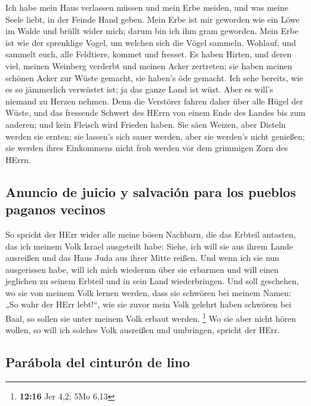  Ich habe mein Haus verlassen müssen und mein Erbe meiden,
und was meine Seele liebt, in der Feinde Hand geben.  Mein
Erbe ist mir geworden wie ein Löwe im Walde und brüllt wider mich; darum
bin ich ihm gram geworden.  Mein Erbe ist wie der
sprenklige Vogel, um welchen sich die Vögel sammeln. Wohlauf, und
sammelt euch, alle Feldtiere, kommet und fresset.  Es
haben Hirten, und deren viel, meinen Weinberg verderbt und meinen Acker
zertreten; sie haben meinen schönen Acker zur Wüste gemacht, sie haben's
öde gemacht.  Ich sehe bereits, wie es so jämmerlich
verwüstet ist; ja das ganze Land ist wüst. Aber es will's niemand zu
Herzen nehmen.  Denn die Verstörer fahren daher über alle
Hügel der Wüste, und das fressende Schwert des HErrn von einem Ende des
Landes bis zum anderen; und kein Fleisch wird Frieden haben.
 Sie säen Weizen, aber Disteln werden sie ernten; sie
lassen's sich sauer werden, aber sie werden's nicht genießen; sie werden
ihres Einkommens nicht froh werden vor dem grimmigen Zorn des HErrn.

\hypertarget{anuncio-de-juicio-y-salvaciuxf3n-para-los-pueblos-paganos-vecinos}{%
\subsection{Anuncio de juicio y salvación para los pueblos paganos
vecinos}\label{anuncio-de-juicio-y-salvaciuxf3n-para-los-pueblos-paganos-vecinos}}

 So spricht der HErr wider alle meine bösen Nachbarn, die
das Erbteil antasten, das ich meinem Volk Israel ausgeteilt habe: Siehe,
ich will sie aus ihrem Lande ausreißen und das Haus Juda aus ihrer Mitte
reißen.  Und wenn ich sie nun ausgerissen habe, will ich
mich wiederum über sie erbarmen und will einen jeglichen zu seinem
Erbteil und in sein Land wiederbringen.  Und soll
geschehen, wo sie von meinem Volk lernen werden, dass sie schwören bei
meinem Namen: „So wahr der HErr lebt!{}``, wie sie zuvor mein Volk
gelehrt haben schwören bei Baal, so sollen sie unter meinem Volk erbaut
werden. \footnote{\textbf{12:16} Jer 4,2; 5Mo 6,13}  Wo
sie aber nicht hören wollen, so will ich solches Volk ausreißen und
umbringen, spricht der HErr.

\hypertarget{paruxe1bola-del-cinturuxf3n-de-lino}{%
\subsection{Parábola del cinturón de
lino}\label{paruxe1bola-del-cinturuxf3n-de-lino}}

